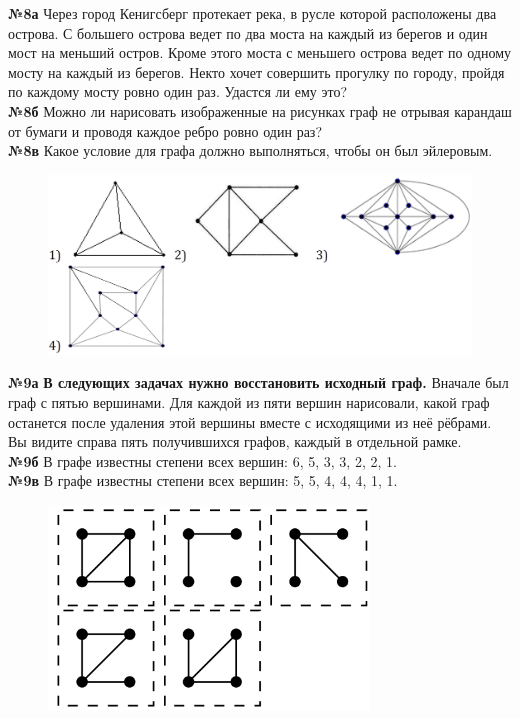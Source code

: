 \documentclass[12 pt, a4paper]{article}%
\newcommand{\task}[1]{{{\vspace{0.6cm} \vspace{-2ex} \textbf{№{#1}}  }}}
\begin{document}
	\task{8а} Через город Кенигсберг протекает река, в русле которой расположены два
	острова. С большего острова ведет по два моста на каждый из
	берегов и один мост на меньший остров. Кроме этого
	моста с меньшего острова ведет по одному мосту на
	каждый из берегов. Некто хочет совершить прогулку по
	городу, пройдя по каждому мосту ровно один раз. Удастся ли ему это?\\
	\task{8б} Можно ли нарисовать изображенные на рисунках граф не отрывая карандаш от бумаги и проводя каждое ребро ровно один раз?\\
	\task{8в} Какое условие для графа должно выполняться, чтобы он был эйлеровым.\\
	\begin{center}
			\begin{figure}[h]
			\includegraphics[width=\linewidth]{pic.png}
		\end{figure}
	\end{center}
	\vspace{-6ex}
	\task{9а} \textbf{В следующих задачах нужно восстановить исходный граф.} Вначале был граф с пятью вершинами. Для каждой из пяти вершин нарисовали,
	какой граф останется после удаления этой вершины вместе с исходящими из неё рёбрами. Вы видите
	справа пять получившихся графов, каждый в отдельной рамке.\\
	\task{9б} В графе известны степени всех вершин: 6, 5, 3, 3, 2, 2, 1. \\
	\task{9в} В графе известны степени всех вершин: 5, 5, 4, 4, 4, 1, 1. \\
	\begin{center}
			\begin{figure}[h]
				\centering
			\includegraphics[width=0.33\linewidth]{pic2.png}
		\end{figure}
	\end{center}
\end{document}
